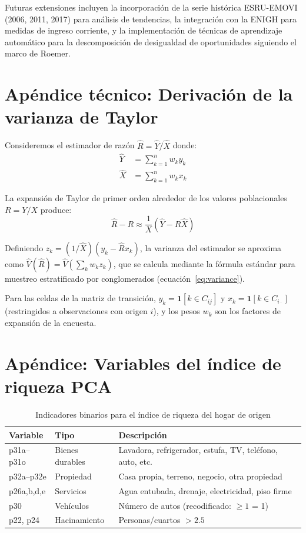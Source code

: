 \documentclass[12pt, a4paper]{article}
\begin{document}
Futuras extensiones incluyen la incorporación de la serie histórica ESRU-EMOVI (2006, 2011, 2017) para análisis de tendencias, la integración con la ENIGH para medidas de ingreso corriente, y la implementación de técnicas de aprendizaje automático para la descomposición de desigualdad de oportunidades siguiendo el marco de Roemer.


\appendix

\section{Apéndice técnico: Derivación de la varianza de Taylor}
\label{app:taylor}

Consideremos el estimador de razón $\hat{R} = \hat{Y}/\hat{X}$ donde:
\begin{align}
    \hat{Y} &= \sum_{k=1}^{n} w_k y_k \\
    \hat{X} &= \sum_{k=1}^{n} w_k x_k
\end{align}

La expansión de Taylor de primer orden alrededor de los valores poblacionales $R = Y/X$ produce:
\begin{equation}
    \hat{R} - R \approx \frac{1}{X} \left( \hat{Y} - R \hat{X} \right)
\end{equation}

Definiendo $z_k = (1/\hat{X})(y_k - \hat{R} x_k)$, la varianza del estimador se aproxima como $\hat{V}(\hat{R}) = \hat{V}\left(\sum_k w_k z_k\right)$, que se calcula mediante la fórmula estándar para muestreo estratificado por conglomerados (ecuación~\ref{eq:variance}).

Para las celdas de la matriz de transición, $y_k = \mathbf{1}[k \in C_{ij}]$ y $x_k = \mathbf{1}[k \in C_{i\cdot}]$ (restringidos a observaciones con origen $i$), y los pesos $w_k$ son los factores de expansión de la encuesta.

\section{Apéndice: Variables del índice de riqueza PCA}
\label{app:wealth}

\begin{table}[H]
\centering
\small
\caption{Indicadores binarios para el índice de riqueza del hogar de origen}
\label{tab:origin_assets}
\begin{tabular}{llp{7cm}}
\toprule
\textbf{Variable} & \textbf{Tipo} & \textbf{Descripción} \\
\midrule
p31a--p31o & Bienes durables & Lavadora, refrigerador, estufa, TV, teléfono, auto, etc. \\
p32a--p32e & Propiedad & Casa propia, terreno, negocio, otra propiedad \\
p26a,b,d,e & Servicios & Agua entubada, drenaje, electricidad, piso firme \\
p30 & Vehículos & Número de autos (recodificado: $\geq 1$ = 1) \\
p22, p24 & Hacinamiento & Personas/cuartos $> 2.5$ \\
\bottomrule
\end{tabular}
\end{table}



\end{document}
